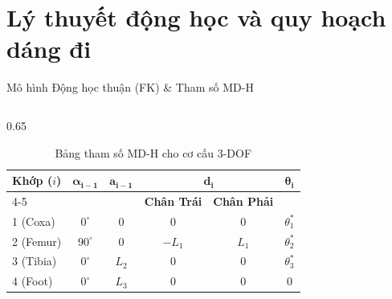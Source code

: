 \documentclass[10pt,aspectratio=169]{beamer}
\begin{document}
\section{Lý thuyết động học và quy hoạch dáng đi}

\begin{frame}{Mô hình Động học thuận (FK) \& Tham số MD-H}
  \begin{columns}
      \begin{column}{0.65\textwidth}
          \begin{table}[htbp]
              \centering\tiny
              \def\arraystretch{1.3}
              \begin{tabular}{l c c c c c}
                  \toprule
                  \textbf{Khớp ($i$)} & $\boldsymbol{\alpha_{i-1}}$ & $\boldsymbol{a_{i-1}}$ & \multicolumn{2}{c}{$\boldsymbol{d_i}$} & $\boldsymbol{\theta_i}$ \\
                  \cmidrule(lr){4-5}
                  & & & \textbf{Chân Trái} & \textbf{Chân Phải} & \\
                  \midrule
                  1 (Coxa)  & $0^\circ$ & $0$   & $0$    & $0$   & $\theta_1^*$ \\
                  2 (Femur) & $90^\circ$& $0$   & $-L_1$ & $L_1$ & $\theta_2^*$ \\
                  3 (Tibia) & $0^\circ$ & $L_2$ & $0$    & $0$   & $\theta_3^*$ \\
                  4 (Foot)  & $0^\circ$ & $L_3$ & $0$    & $0$   & $0$ \\
                  \bottomrule
              \end{tabular}
              \caption{Bảng tham số MD-H cho cơ cấu 3-DOF}
          \end{table}
          

\end{column}
\end{columns}
\end{frame}
\end{document}
